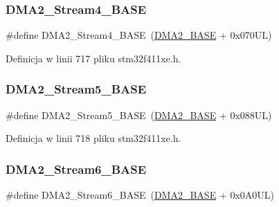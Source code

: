\subsubsection{\texorpdfstring{D\+M\+A2\+\_\+\+Stream4\+\_\+\+B\+A\+SE}{DMA2\_Stream4\_BASE}}
{\footnotesize\ttfamily \#define D\+M\+A2\+\_\+\+Stream4\+\_\+\+B\+A\+SE~(\hyperlink{group___peripheral__memory__map_gab72a9ae145053ee13d1d491fb5c1df64}{D\+M\+A2\+\_\+\+B\+A\+SE} + 0x070\+U\+L)}



Definicja w linii 717 pliku stm32f411xe.\+h.

\mbox{\label{group___peripheral__memory__map_gaed1460fdc407b6decfbffccb0260d0af}} 
\subsubsection{\texorpdfstring{D\+M\+A2\+\_\+\+Stream5\+\_\+\+B\+A\+SE}{DMA2\_Stream5\_BASE}}
{\footnotesize\ttfamily \#define D\+M\+A2\+\_\+\+Stream5\+\_\+\+B\+A\+SE~(\hyperlink{group___peripheral__memory__map_gab72a9ae145053ee13d1d491fb5c1df64}{D\+M\+A2\+\_\+\+B\+A\+SE} + 0x088\+U\+L)}



Definicja w linii 718 pliku stm32f411xe.\+h.

\mbox{\label{group___peripheral__memory__map_ga5e81174c96fd204fa7c82c815e85c8e6}} 
\subsubsection{\texorpdfstring{D\+M\+A2\+\_\+\+Stream6\+\_\+\+B\+A\+SE}{DMA2\_Stream6\_BASE}}
{\footnotesize\ttfamily \#define D\+M\+A2\+\_\+\+Stream6\+\_\+\+B\+A\+SE~(\hyperlink{group___peripheral__memory__map_gab72a9ae145053ee13d1d491fb5c1df64}{D\+M\+A2\+\_\+\+B\+A\+SE} + 0x0\+A0\+U\+L)}



